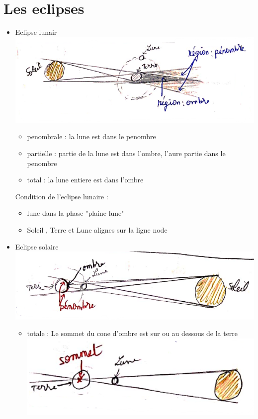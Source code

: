 \documentclass[12pt]{book}
\begin{document}
    \chapter{Les eclipses}
        \begin{itemize}
            \item Eclipse lunair\\
                \includegraphics[width=0.7\linewidth]{pic/lunaireclipse.png}
                \begin{itemize}
                    \item penombrale : la lune est dans le penombre 
                    \item partielle : partie de la lune est dans l'ombre, l'aure partie dans le penombre 
                    \item total : la lune entiere est dans l'ombre
                \end{itemize}
                Condition de l'eclipse lunaire : \begin{itemize}
                    \item lune dans la phase "plaine lune"
                    \item Soleil , Terre et Lune alignes sur la ligne node
                \end{itemize}
            \pagebreak
            \item Eclipse solaire\\
                \includegraphics[width=0.7\linewidth]{pic/solaireclipse.png}
                \begin{itemize}
                    \item totale : Le sommet du cone d'ombre est sur ou au dessous de la terre 
                        \includegraphics[width=0.3\linewidth]{pic/solareclipstotal.png}

\end{itemize}
\end{itemize}
\end{document}

